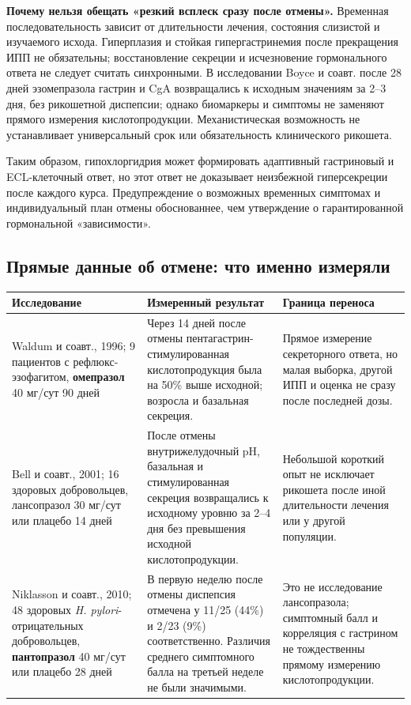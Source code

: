 \documentclass[11pt,a4paper,notitlepage]{report}
\newcommand{\Hp}{\textit{H. pylori}}
\newcommand{\src}[1]{\unskip\space\cite{#1}}
\begin{document}
\textbf{Почему нельзя обещать «резкий всплеск сразу после отмены».} Временная последовательность зависит от длительности лечения, состояния слизистой и изучаемого исхода. Гиперплазия и стойкая гипергастринемия после прекращения ИПП не обязательны; восстановление секреции и исчезновение гормонального ответа не следует считать синхронными. В исследовании Boyce и соавт. после 28 дней эзомепразола гастрин и CgA возвращались к исходным значениям за 2--3 дня, без рикошетной диспепсии; однако биомаркеры и симптомы не заменяют прямого измерения кислотопродукции. Механистическая возможность не устанавливает универсальный срок или обязательность клинического рикошета.\src{withdrawboyce2017,withdrawbell,vision2025}

Таким образом, гипохлоргидрия может формировать адаптивный гастриновый и ECL-клеточный ответ, но этот ответ не доказывает неизбежной гиперсекреции после каждого курса. Предупреждение о возможных временных симптомах и индивидуальный план отмены обоснованнее, чем утверждение о гарантированной гормональной «зависимости».\src{molrestore,uslabel,agadepres}

\subsection{Прямые данные об отмене: что именно измеряли}
\begin{longtable}{P{0.26\textwidth}P{0.37\textwidth}P{0.28\textwidth}}
\toprule
Исследование & Измеренный результат & Граница переноса \\
\midrule
\endhead
Waldum и соавт., 1996; 9 пациентов с рефлюкс-эзофагитом, \textbf{омепразол} 40 мг/сут 90 дней & Через 14 дней после отмены пентагастрин-стимулированная кислотопродукция была на 50\% выше исходной; возросла и базальная секреция.\src{withdrawwaldum1996} & Прямое измерение секреторного ответа, но малая выборка, другой ИПП и оценка не сразу после последней дозы. \\
Bell и соавт., 2001; 16 здоровых добровольцев, лансопразол 30 мг/сут или плацебо 14 дней & После отмены внутрижелудочный pH, базальная и стимулированная секреция возвращались к исходному уровню за 2--4 дня без превышения исходной кислотопродукции.\src{withdrawbell} & Небольшой короткий опыт не исключает рикошета после иной длительности лечения или у другой популяции. \\
Niklasson и соавт., 2010; 48 здоровых \Hp-отрицательных добровольцев, \textbf{пантопразол} 40 мг/сут или плацебо 28 дней & В первую неделю после отмены диспепсия отмечена у 11/25 (44\%) и 2/23 (9\%) соответственно. Различия среднего симптомного балла на третьей неделе не были значимыми.\src{withdrawniklasson} & Это не исследование лансопразола; симптомный балл и корреляция с гастрином не тождественны прямому измерению кислотопродукции. \\
\bottomrule
\end{longtable}
\end{document}
